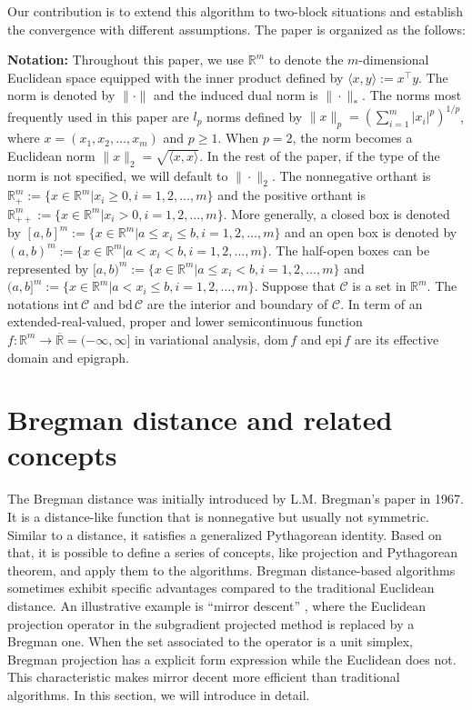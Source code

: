 \documentclass{svjour3}                %
\def \R {{\mathbb{R}}}
\def \C {{\mathcal{C}}}
\newcommand{\dom}[1]{\mathrm{dom}\,{#1}} %
\newcommand{\inter}[1]{\mathrm{int}\,{#1}} %
\newcommand{\epi}[1]{\mathrm{epi}\,{#1}} %
\newcommand{\bd}[1]{\mathrm{bd}\,{#1}} %
\begin{document}
Our contribution is to extend this algorithm to two-block situations and establish the convergence with different assumptions. The paper is organized as the follows:

{\bf Notation:} Throughout this paper, we use $\R^m$ to denote the $m$-dimensional Euclidean space equipped with the inner product defined by $\langle x , y \rangle:=x^{\top}y$. The norm is denoted by $\| \cdot \|$ and the induced dual norm is $\| \cdot \|_*$. The norms most frequently used in this paper are $l_p$ norms defined by $\|x\|_p=\left(\sum_{i=1}^m |x_i|^p\right)^{1/p}$, where $x=(x_1,x_2,\ldots,x_m)$ and $p\geq 1$. When $p=2$, the norm becomes a Euclidean norm $\|x\|_2=\sqrt{\langle x,x \rangle}$. In the rest of the paper, if the type of the norm is not specified, we will default to $\|\cdot\|_2$. The nonnegative orthant is $\R_{+}^m:=\{x\in\R^m|x_i\geq 0, i=1,2,\ldots,m\}$ and the positive orthant is $\R_{++}^m:=\{x\in\R^m|x_i> 0, i=1,2,\ldots,m\}$. More generally, a closed box is denoted by $[a,b]^m:=\{x\in\R^m|a \leq x_i \leq b, i=1,2,\ldots,m\}$ and an open box is denoted by $(a,b)^m:=\{x\in\R^m|a < x_i < b, i=1,2,\ldots,m\}$. The half-open boxes can be represented by $[a,b)^m:=\{x\in\R^m|a \leq x_i < b, i=1,2,\ldots,m\}$
and $(a,b]^m:=\{x\in\R^m|a < x_i \leq b, i=1,2,\ldots,m\}$. Suppose that $\C$ is a set in $\R^m$. The notations $\inter \C$ and $\bd \C$ are the interior and boundary of $\C$. In term of an extended-real-valued, proper and lower semicontinuous function $f:\R^m\rightarrow\overline{\R}=(-\infty,\infty]$ in variational analysis, $\dom f$ and $\epi f$ are its effective domain and epigraph.



\section{Bregman distance and related concepts}
The Bregman distance was initially introduced by L.M. Bregman's paper \cite{B67} in 1967. It is a distance-like function that is nonnegative but usually not symmetric. Similar to a distance, it satisfies a generalized Pythagorean identity. Based on that, it is possible to define a series of concepts, like projection and Pythagorean theorem, and apply them to the algorithms. Bregman distance-based algorithms sometimes exhibit specific advantages compared to the traditional Euclidean distance. An illustrative example is ``mirror descent'' \cite{AM03}, where the Euclidean projection operator in the subgradient projected method is replaced by a Bregman one. When the set associated to the operator is a unit simplex, Bregman projection has a explicit form expression while the Euclidean does not. This characteristic makes mirror decent more efficient than traditional algorithms. In this section, we will introduce in detail.
\end{document}
